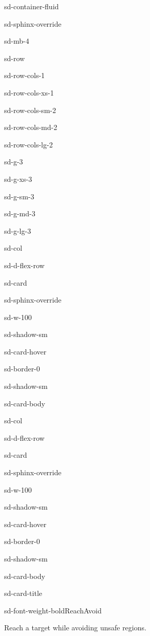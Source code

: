 \documentclass[a4paper,10pt,english]{sphinxmanual}
\begin{document}
\begin{sphinxuseclass}{sd-container-fluid}
\begin{sphinxuseclass}{sd-sphinx-override}
\begin{sphinxuseclass}{sd-mb-4}
\begin{sphinxuseclass}{sd-row}
\begin{sphinxuseclass}{sd-row-cols-1}
\begin{sphinxuseclass}{sd-row-cols-xs-1}
\begin{sphinxuseclass}{sd-row-cols-sm-2}
\begin{sphinxuseclass}{sd-row-cols-md-2}
\begin{sphinxuseclass}{sd-row-cols-lg-2}
\begin{sphinxuseclass}{sd-g-3}
\begin{sphinxuseclass}{sd-g-xs-3}
\begin{sphinxuseclass}{sd-g-sm-3}
\begin{sphinxuseclass}{sd-g-md-3}
\begin{sphinxuseclass}{sd-g-lg-3}
\begin{sphinxuseclass}{sd-col}
\begin{sphinxuseclass}{sd-d-flex-row}
\begin{sphinxuseclass}{sd-card}
\begin{sphinxuseclass}{sd-sphinx-override}
\begin{sphinxuseclass}{sd-w-100}
\begin{sphinxuseclass}{sd-shadow-sm}
\begin{sphinxuseclass}{sd-card-hover}
\begin{sphinxuseclass}{sd-border-0}
\begin{sphinxuseclass}{sd-shadow-sm}
\begin{sphinxuseclass}{sd-card-body}
\end{sphinxuseclass}{\hyperref[\detokenize{examples/reachability::doc}]{}}
\end{sphinxuseclass}
\end{sphinxuseclass}
\end{sphinxuseclass}
\end{sphinxuseclass}
\end{sphinxuseclass}
\end{sphinxuseclass}
\end{sphinxuseclass}
\end{sphinxuseclass}
\end{sphinxuseclass}
\begin{sphinxuseclass}{sd-col}
\begin{sphinxuseclass}{sd-d-flex-row}
\begin{sphinxuseclass}{sd-card}
\begin{sphinxuseclass}{sd-sphinx-override}
\begin{sphinxuseclass}{sd-w-100}
\begin{sphinxuseclass}{sd-shadow-sm}
\begin{sphinxuseclass}{sd-card-hover}
\begin{sphinxuseclass}{sd-border-0}
\begin{sphinxuseclass}{sd-shadow-sm}
\begin{sphinxuseclass}{sd-card-body}
\begin{sphinxuseclass}{sd-card-title}
\begin{sphinxuseclass}{sd-font-weight-bold}Reach\sphinxhyphen{}Avoid
\end{sphinxuseclass}
\end{sphinxuseclass}
\sphinxAtStartPar
Reach a target while avoiding unsafe regions.


\end{sphinxuseclass}
\end{sphinxuseclass}
\end{sphinxuseclass}
\end{sphinxuseclass}
\end{sphinxuseclass}
\end{sphinxuseclass}
\end{sphinxuseclass}
\end{sphinxuseclass}
\end{sphinxuseclass}
\end{sphinxuseclass}
\end{sphinxuseclass}
\end{sphinxuseclass}
\end{sphinxuseclass}
\end{sphinxuseclass}
\end{sphinxuseclass}
\end{sphinxuseclass}
\end{sphinxuseclass}
\end{sphinxuseclass}
\end{sphinxuseclass}
\end{sphinxuseclass}
\end{sphinxuseclass}
\end{sphinxuseclass}
\end{sphinxuseclass}
\end{sphinxuseclass}
\end{document}
